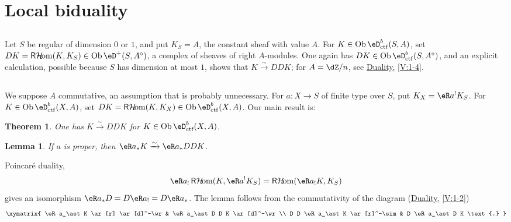 \documentclass[12pt,oneside,english]{smfbook}
\DeclareMathOperator{\ob}{Ob}
\DeclareMathOperator{\rHom}{\mathsf{R}\mathcal{H}\!om}
\newcommand{\iso}{\xrightarrow\sim}
\newtheorem{lemma_}[subsection]{Lemma}
\newtheorem{theorem_}[subsection]{Theorem}
\begin{document}
\section{Local biduality}\label{VII:4}

\subsection{}\label{VII:4-1}

Let $S$ be regular of dimension $0$ or $1$, and put $K_S=A$, the constant sheaf with value $A$. For $K\in\ob\eD_{\mathrm{ctf}}^b(S,A)$, set $DK=\rHom(K,K_S)\in\ob\eD^+(S,A^\circ)$, a complex of sheaves of right $A$-modules. One again has $DK\in\ob\eD_{\mathrm{ctf}}^b(S,A^\circ)$, and an explicit calculation, possible because $S$ has dimension at most $1$, shows that $K\iso DDK$; for $A=\dZ/n$, see \hyperref[V]{Duality}, \ref{V:1-4}.

\subsection{}\label{VII:4-2}

We suppose $A$ commutative, an assumption that is probably unnecessary. For $a:X\to S$ of finite type over $S$, put $K_X=\eR a^!K_S$. For $K\in\ob\eD_{\mathrm{ctf}}^b(X,A)$, set $DK=\rHom(K,K_X)\in\ob\eD_{\mathrm{ctf}}^b(X,A)$. Our main result is:

\begin{theorem_}\label{VII:4-3}
One has $K\iso DDK$ for $K\in\ob\eD_\textnormal{ctf}^b(X,A)$.
\end{theorem_}

\begin{lemma_}\label{VII:4-4}
If $a$ is proper, then $\eR a_\ast K\iso\eR a_\ast DDK$.
\end{lemma_}

Poincaré duality,
\[
  \eR a_! \rHom(K,\eR a^! K_S) = \rHom(\eR a_! K,K_S)
\]
gives an isomorphism $\eR a_\ast D=D\eR a_!=D\eR a_\ast$. The lemma follows from the commutativity of the diagram (\hyperref[V]{Duality}, \ref{V:1-2})
\[\xymatrix{
  \eR a_\ast K \ar[r] \ar[d]^-\wr
    & \eR a_\ast D D K \ar[d]^-\wr \\
  D D \eR a_\ast K \ar[r]^-\sim
    & D \eR a_\ast D K \text{.}
}\]

\subsection{}\label{VII:4-5}
\end{document}
